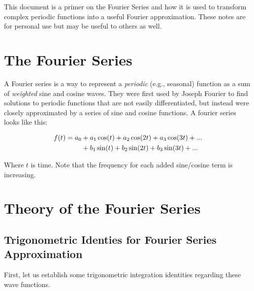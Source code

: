 \documentclass[10pt]{article} %
\begin{document}
This document is a primer on the Fourier Series and how it is used to transform complex periodic functions into a useful Fourier approximation. These notes are for personal use but may be useful to others as well.

\section{The Fourier Series}

A Fourier series is a way to represent a \textit{periodic} (e.g., seasonal) function as a sum of \textit{weighted} sine and cosine waves. They were first used by Joseph Fourier to find solutions to periodic functions that are not easily differentiated, but instead were closely approximated by a series of sine and cosine functions. A fourier series looks like this:

\begin{align}
f(t) = a_0 & + a_1\cos(t) + a_2\cos(2t) + a_3\cos(3t) + ... \\
           & + b_1\sin(t) + b_2\sin(2t) + b_3\sin(3t) + ... \notag
\end{align}

Where $t$ is time. Note that the frequency for each added sine/cosine term is increasing.

\section{Theory of the Fourier Series}

\subsection{Trigonometric Identies for Fourier Series Approximation}

First, let us establish some trigonometric integration identities regarding these wave functions.
\end{document}
